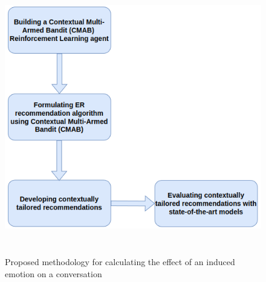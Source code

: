 \begin{figure}[h]
  
    \centering
    \includegraphics[width=12cm,height=12cm,keepaspectratio]{res3.png}
  \caption{Proposed methodology for calculating the effect of an induced emotion on a conversation}
  \label{fig:Frameworkres3}
  \end{figure} 
